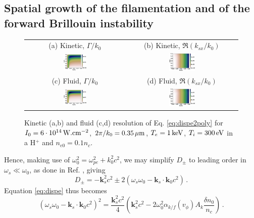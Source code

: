\documentclass[
 reprint,
 superscriptaddress,
 amsmath,amssymb,
 aps,
]{revtex4-1}
\begin{document}
\subsection{Spatial growth of the filamentation and of the forward Brillouin instability}

\begin{figure}
\begin{tabular}{cc}
(a) Kinetic, $\Gamma/k_0$ &
(b)  Kinetic, $\Re(k_{sx}/k_0)$ \\
\includegraphics[width=0.24\textwidth]{Fig1a.eps}&
\includegraphics[width=0.24\textwidth]{Fig1b.eps}\\
(c) Fluid, $\Gamma/k_0$  &
(d) Fluid, $\Re(k_{sx}/k_0)$  \\
\includegraphics[width=0.24\textwidth]{Fig1c.eps}&
\includegraphics[width=0.24\textwidth]{Fig1d.eps}
\end{tabular}
\caption{ \label{fig:dispe}  
Kinetic (a,b) and fluid (c,d) resolution of Eq. \eqref{eq:dispe2poly} for  $I_0 = 6\cdot 10^{14}\, \rm W.cm^{-2}$, $2\pi/k_0=0.35 \,\rm\mu m$, $T_e =1\,\rm  keV$, $ T_i=300\,  \rm eV$ in a H$^+$ and $n_{e0}=0.1n_c$.
 }
\end{figure}
Hence,  making use of $\omega_0^2=\omega_{pe}^2 +k_0^2c^2$, we may simplify $D_\pm$ to leading order in $\omega_s\ll\omega_0$, as done in Ref. \cite[]{POP_Kaiser_1993}, giving  
\begin{equation}\label{eq:dpm}
D_\pm = -\mathbf{k}_s^2c^2\pm 2(\omega_s\omega_0 - \mathbf{k}_s\cdot\mathbf{k}_0 c^2) \, .
\end{equation} 
Equation \eqref{eq:dispe} thus becomes 
\begin{equation}\label{eq:dispe2} 
(\omega_s\omega_0 - \mathbf{k}_s\cdot\mathbf{k}_0 c^2)^2
=\frac{\mathbf{k}_s^2c^2}{4}\left( \mathbf{k}_s^2c^2 - 2\omega_{0}^2\alpha_{k/f}(v_\phi)A_k\frac{\delta n_0}{n_c} \right) 
\, .
\end{equation}
\end{document}
